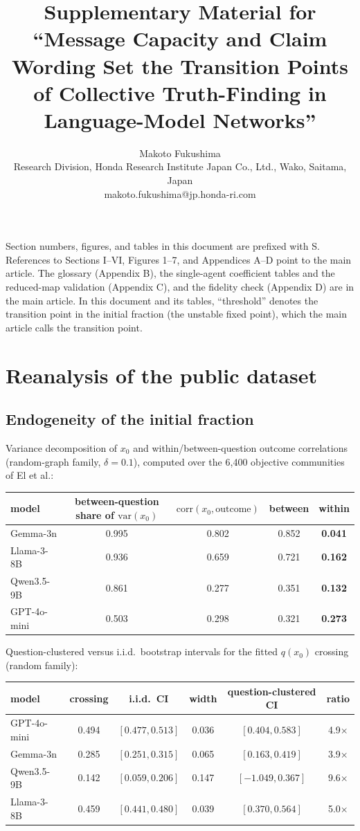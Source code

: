 \documentclass[11pt]{article}
\title{Supplementary Material for\\ ``Message Capacity and Claim Wording Set the Transition Points of Collective Truth-Finding in Language-Model Networks''}
\author{Makoto Fukushima\\[3pt]
{\normalsize Research Division, Honda Research Institute Japan Co., Ltd., Wako, Saitama, Japan}\\[2pt]
{\small makoto.fukushima@jp.honda-ri.com}}
\date{}
\begin{document}
\maketitle
\noindent Section numbers, figures, and tables in this document are prefixed with S. References to Sections I--VI, Figures 1--7, and Appendices A--D point to the main article. The glossary (Appendix B), the single-agent coefficient tables and the reduced-map validation (Appendix C), and the fidelity check (Appendix D) are in the main article. In this document and its tables, ``threshold'' denotes the transition point in the initial fraction (the unstable fixed point), which the main article calls the transition point.

\section{Reanalysis of the public dataset}

\subsection{Endogeneity of the initial fraction}

Variance decomposition of $x_0$ and within/between-question outcome
correlations (random-graph family, $\delta = 0.1$), computed over the 6{,}400
objective communities of El et al.:

\begin{center}
\begin{tabular}{lcccc}
\toprule
model & between-question share of $\mathrm{var}(x_0)$ &
$\mathrm{corr}(x_0,\text{outcome})$ & between & \textbf{within} \\
\midrule
Gemma-3n     & 0.995 & 0.802 & 0.852 & \textbf{0.041} \\
Llama-3-8B   & 0.936 & 0.659 & 0.721 & \textbf{0.162} \\
Qwen3.5-9B   & 0.861 & 0.277 & 0.351 & \textbf{0.132} \\
GPT-4o-mini  & 0.503 & 0.298 & 0.321 & \textbf{0.273} \\
\bottomrule
\end{tabular}
\end{center}

Question-clustered versus i.i.d.\ bootstrap intervals for the fitted
$q(x_0)$ crossing (random family):

\begin{center}
\begin{tabular}{lccccc}
\toprule
model & crossing & i.i.d.\ CI & width & question-clustered CI & ratio \\
\midrule
GPT-4o-mini & 0.494 & $[0.477, 0.513]$ & 0.036 & $[0.404, 0.583]$ & 4.9$\times$ \\
Gemma-3n    & 0.285 & $[0.251, 0.315]$ & 0.065 & $[0.163, 0.419]$ & 3.9$\times$ \\
Qwen3.5-9B  & 0.142 & $[0.059, 0.206]$ & 0.147 & $[-1.049, 0.367]$ & 9.6$\times$ \\
Llama-3-8B  & 0.459 & $[0.441, 0.480]$ & 0.039 & $[0.370, 0.564]$ & 5.0$\times$ \\
\bottomrule
\end{tabular}
\end{center}
\end{document}
